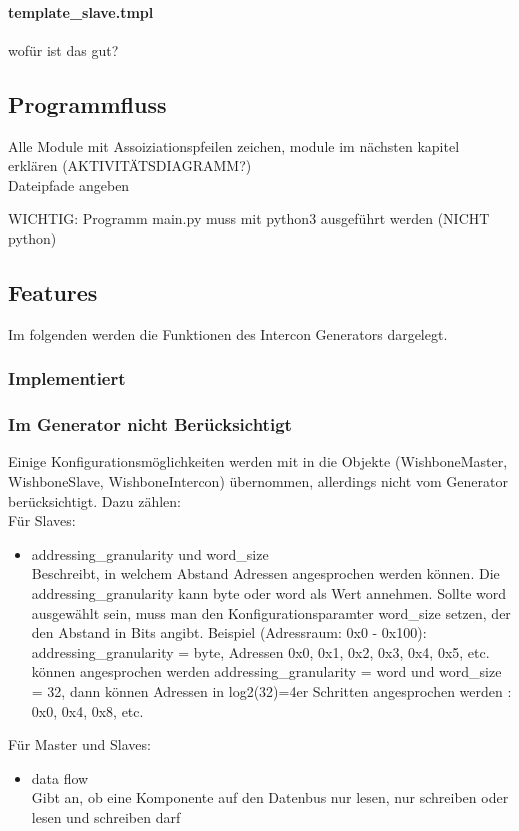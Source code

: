 \documentclass{article}
\begin{document}
\paragraph{template\_slave.tmpl}
wofür ist das gut?
\subsection{Programmfluss}
Alle Module mit Assoiziationspfeilen zeichen, module im nächsten kapitel erklären (AKTIVITÄTSDIAGRAMM?)\\
Dateipfade angeben

WICHTIG: Programm main.py muss mit python3 ausgeführt werden (NICHT python)
\subsection{Features}
Im folgenden werden die Funktionen des Intercon Generators dargelegt.
\subsubsection{Implementiert}
\subsubsection{Im Generator nicht Berücksichtigt}
Einige Konfigurationsmöglichkeiten werden mit in die Objekte (WishboneMaster, WishboneSlave, WishboneIntercon) übernommen, allerdings nicht vom Generator berücksichtigt. Dazu zählen:\\
Für Slaves:
\begin{itemize}
\item addressing\_granularity und word\_size\\
Beschreibt, in welchem Abstand Adressen angesprochen werden können.
Die addressing\_granularity kann byte oder word als Wert annehmen.
Sollte word ausgewählt sein, muss man den Konfigurationsparamter word\_size 
setzen, der den Abstand in Bits angibt. Beispiel (Adressraum: 0x0 - 0x100):\\
addressing\_granularity = byte, Adressen 0x0, 0x1, 0x2, 0x3, 0x4, 0x5, etc. können angesprochen werden
addressing\_granularity = word und word\_size = 32, dann können Adressen in log2(32)=4er Schritten angesprochen werden : 0x0, 0x4, 0x8, etc.
\end{itemize}
Für Master und Slaves:
\begin{itemize}
\item data flow\\
Gibt an, ob eine Komponente auf den Datenbus nur lesen, nur schreiben oder lesen und schreiben darf
\end{itemize}
\end{document}
